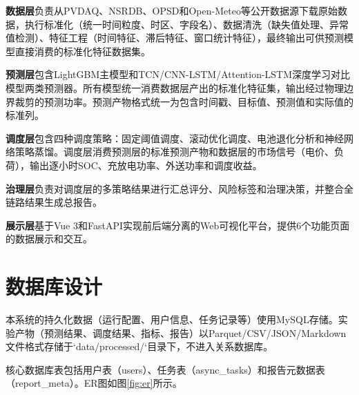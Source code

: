 \documentclass[12pt,a4paper]{ctexbook}
\begin{document}
\textbf{数据层}负责从PVDAQ、NSRDB、OPSD和Open-Meteo等公开数据源下载原始数据，执行标准化（统一时间粒度、时区、字段名）、数据清洗（缺失值处理、异常值检测）、特征工程（时间特征、滞后特征、窗口统计特征），最终输出可供预测模型直接消费的标准化特征数据集。

\textbf{预测层}包含LightGBM主模型和TCN/CNN-LSTM/Attention-LSTM深度学习对比模型两类预测器。所有模型统一消费数据层产出的标准化特征集，输出经过物理边界裁剪的预测功率。预测产物格式统一为包含时间戳、目标值、预测值和实际值的标准列。

\textbf{调度层}包含四种调度策略：固定阈值调度、滚动优化调度、电池退化分析和神经网络策略蒸馏。调度层消费预测层的标准预测产物和数据层的市场信号（电价、负荷），输出逐小时SOC、充放电功率、外送功率和调度收益。

\textbf{治理层}负责对调度层的多策略结果进行汇总评分、风险标签和治理决策，并整合全链路结果生成总报告。

\textbf{展示层}基于Vue 3和FastAPI实现前后端分离的Web可视化平台，提供6个功能页面的数据展示和交互。

\section{数据库设计}

本系统的持久化数据（运行配置、用户信息、任务记录等）使用MySQL存储。实验产物（预测结果、调度结果、指标、报告）以Parquet/CSV/JSON/Markdown文件格式存储于`data/processed/`目录下，不进入关系数据库。

核心数据库表包括用户表（users）、任务表（async\_tasks）和报告元数据表（report\_meta）。ER图如图\ref{fig:er}所示。
\end{document}

